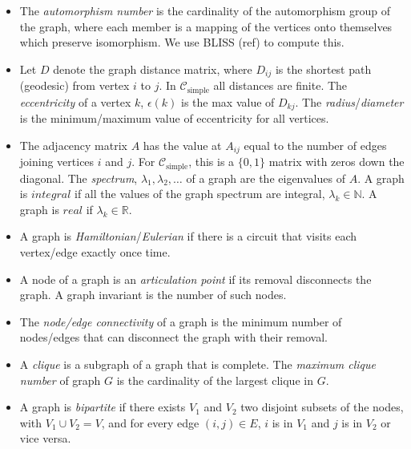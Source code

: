 \documentclass[12pt]{article}
\newcommand{\SIMPLECLASS}{\mathcal{C}_\text{simple}}
\begin{document}
\begin{itemize}
\item The \textit{automorphism number} is the cardinality of the automorphism group of the graph, where each member is a mapping of the vertices onto themselves which preserve isomorphism. We use BLISS (ref) to compute this.

\item Let $D$ denote the graph distance matrix, where $D_{ij}$ is the shortest path (geodesic) from vertex $i$ to $j$.
In $\SIMPLECLASS$ all distances are finite.
The \textit{eccentricity} of a vertex $k$, $\epsilon(k)$ is the max value of $D_{k j}$.
The \textit{radius}/\textit{diameter} is the minimum/maximum value of eccentricity for all vertices.

\item The adjacency matrix $A$ has the value at $A_{ij}$ equal to the number of edges joining vertices $i$ and $j$.
For $\SIMPLECLASS$, this is a $\{0,1\}$ matrix with zeros down the diagonal.
The \textit{spectrum}, $\lambda_1, \lambda_2, \ldots$ of a graph are the eigenvalues of $A$.
A graph is $integral$ if all the values of the graph spectrum are integral, $\lambda_k \in \mathbb{N}$.
A graph is $real$ if $\lambda_k \in \mathbb{R}$.

\item A graph is \textit{Hamiltonian}/\textit{Eulerian} if there is a circuit that visits each vertex/edge exactly once time.



\item A node of a graph is an \textit{articulation point} if its removal disconnects the graph. A graph invariant is the number of such nodes. 

\item The \textit{node/edge connectivity} of a graph is the minimum number of nodes/edges that can disconnect the graph with their removal. 

\item A \textit{clique} is a subgraph of a graph that is complete. The \textit{maximum clique number} of graph $G$ is the cardinality of the largest clique in $G$. 

\item A graph is \textit{bipartite} if there exists $V_1$ and $V_2$ two disjoint subsets of the nodes, with $V_1 \cup V_2 = V$, and for every edge $(i,j) \in E$,  $i$ is in $V_1$ and $j$ is in $V_2$ or vice versa.


\end{itemize}
\end{document}
